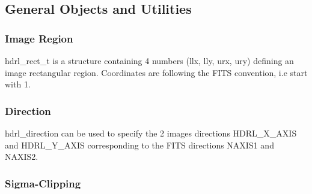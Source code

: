 \subsection{General Objects and Utilities}

\subsubsection{Image Region}

hdrl\_rect\_t is a structure containing 4 numbers (llx, lly, urx, ury)
defining an image rectangular region. Coordinates are following the FITS
convention, i.e start with 1.

\subsubsection{Direction}

hdrl\_direction can be used to specify the 2 images directions
HDRL\_X\_AXIS and HDRL\_Y\_AXIS corresponding to the FITS directions
NAXIS1 and NAXIS2.


\subsubsection{Sigma-Clipping}
\label{sigma-clipping:algo}

\begin{comment}

\begin{verbatim}
cpl_error_code hdrl_kappa_sigma_clip(
        const cpl_vector  * vec,
        const cpl_vector  * vec_err,
        const double        kappa_low,
        const double        kappa_high,
        const int           iter,
        double            * mean_ks,
        double            * mean_ks_err,
        cpl_size          * naccepted,
        double            * reject_low,
        double            * reject_high)
\end{verbatim}

\paragraph{Inputs}
\paragraph{Outputs}
\paragraph{Algorithm}
\end{comment}

